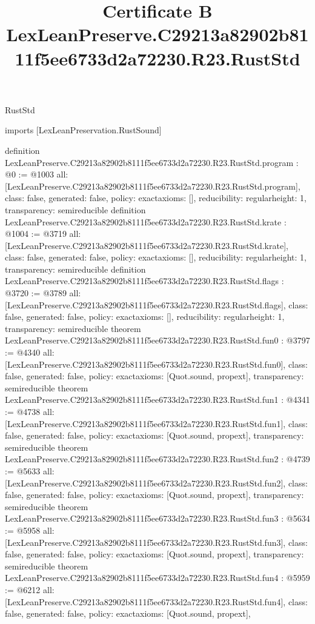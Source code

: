 \begin{lexlean}{RustStd}
\title{Certificate B LexLeanPreserve.C29213a82902b8111f5ee6733d2a72230.R23.RustStd}
\begin{coremodule}
imports [LexLeanPreservation.RustSound]

definition LexLeanPreserve.C29213a82902b8111f5ee6733d2a72230.R23.RustStd.program : @0 := @1003 {
  all: [LexLeanPreserve.C29213a82902b8111f5ee6733d2a72230.R23.RustStd.program],
  class: false,
  generated: false,
  policy: exact{axioms: []},
  reducibility: regular{height: 1},
  transparency: semireducible
}
definition LexLeanPreserve.C29213a82902b8111f5ee6733d2a72230.R23.RustStd.krate : @1004 := @3719 {
  all: [LexLeanPreserve.C29213a82902b8111f5ee6733d2a72230.R23.RustStd.krate],
  class: false,
  generated: false,
  policy: exact{axioms: []},
  reducibility: regular{height: 1},
  transparency: semireducible
}
definition LexLeanPreserve.C29213a82902b8111f5ee6733d2a72230.R23.RustStd.flags : @3720 := @3789 {
  all: [LexLeanPreserve.C29213a82902b8111f5ee6733d2a72230.R23.RustStd.flags],
  class: false,
  generated: false,
  policy: exact{axioms: []},
  reducibility: regular{height: 1},
  transparency: semireducible
}
theorem LexLeanPreserve.C29213a82902b8111f5ee6733d2a72230.R23.RustStd.fun0 : @3797 := @4340 {
  all: [LexLeanPreserve.C29213a82902b8111f5ee6733d2a72230.R23.RustStd.fun0],
  class: false,
  generated: false,
  policy: exact{axioms: [Quot.sound, propext]},
  transparency: semireducible
}
theorem LexLeanPreserve.C29213a82902b8111f5ee6733d2a72230.R23.RustStd.fun1 : @4341 := @4738 {
  all: [LexLeanPreserve.C29213a82902b8111f5ee6733d2a72230.R23.RustStd.fun1],
  class: false,
  generated: false,
  policy: exact{axioms: [Quot.sound, propext]},
  transparency: semireducible
}
theorem LexLeanPreserve.C29213a82902b8111f5ee6733d2a72230.R23.RustStd.fun2 : @4739 := @5633 {
  all: [LexLeanPreserve.C29213a82902b8111f5ee6733d2a72230.R23.RustStd.fun2],
  class: false,
  generated: false,
  policy: exact{axioms: [Quot.sound, propext]},
  transparency: semireducible
}
theorem LexLeanPreserve.C29213a82902b8111f5ee6733d2a72230.R23.RustStd.fun3 : @5634 := @5958 {
  all: [LexLeanPreserve.C29213a82902b8111f5ee6733d2a72230.R23.RustStd.fun3],
  class: false,
  generated: false,
  policy: exact{axioms: [Quot.sound, propext]},
  transparency: semireducible
}
theorem LexLeanPreserve.C29213a82902b8111f5ee6733d2a72230.R23.RustStd.fun4 : @5959 := @6212 {
  all: [LexLeanPreserve.C29213a82902b8111f5ee6733d2a72230.R23.RustStd.fun4],
  class: false,
  generated: false,
  policy: exact{axioms: [Quot.sound, propext]},
}
\end{coremodule}
\end{lexlean}
